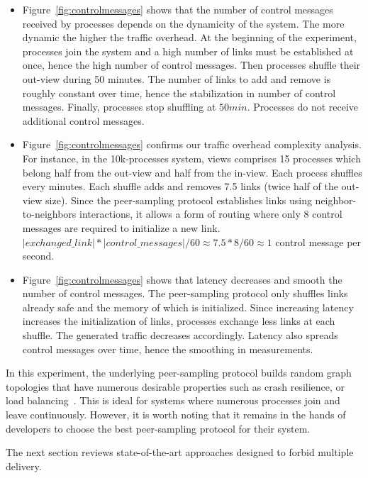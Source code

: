 \begin{itemize}
\item Figure~\ref{fig:controlmessages} shows that the number of control messages
  received by processes depends on the dynamicity of the system. The more
  dynamic the higher the traffic overhead. At the beginning of the experiment,
  processes join the system and a high number of links must be established at
  once, hence the high number of control messages. Then processes shuffle their
  out-view during 50 minutes. The number of links to add and remove is roughly
  constant over time, hence the stabilization in number of control
  messages. Finally, processes stop shuffling at $50min$. Processes do not
  receive additional control messages.
\item Figure~\ref{fig:controlmessages} confirms our traffic overhead complexity
  analysis. For instance, in the 10k-processes system, views comprises 15
  processes which belong half from the out-view and half from the in-view.  Each
  process shuffles every minutes. Each shuffle adds and removes 7.5 links (twice
  half of the out-view size). Since the peer-sampling protocol establishes links
  using neighbor-to-neighbors interactions, it allows a form of routing where
  only 8 control messages are required to initialize a new link.
  $|exchanged\_link|*|control\_messages|/60 \approx 7.5*8/60 \approx 1$ control
  message per second.
\item Figure~\ref{fig:controlmessages} shows that latency decreases and smooth
  the number of control messages. The peer-sampling protocol only shuffles links
  already safe and the memory of which is initialized. Since increasing latency
  increases the initialization of links, processes exchange less links at each
  shuffle. The generated traffic decreases accordingly. Latency also spreads
  control messages over time, hence the smoothing in measurements.
\end{itemize}

\noindent In this experiment, the underlying peer-sampling protocol builds
random graph topologies that have numerous desirable properties such as crash
resilience, or load balancing~\cite{jelasity2007gossip}. This is ideal for
systems where numerous processes join and leave continuously. However, it is
worth noting that it remains in the hands of developers to choose the best
peer-sampling protocol for their system.


The next section reviews state-of-the-art approaches designed to forbid multiple
delivery.




